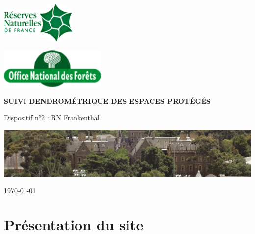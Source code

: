 \documentclass[a4paper]{book}\usepackage[]{graphicx}\usepackage[]{color}
\begin{document}
\thispagestyle{empty} %

\begin{multicols}{2}
\includegraphics[height=2cm]{Images/logo.png}
\begin{flushright}
\includegraphics[height=2cm]{Images/logoONF.png}
\end{flushright}

\end{multicols}

\vspace*{3cm}
\begin{center}
\textbf{SUIVI DENDROMÉTRIQUE DES ESPACES PROTÉGÉS}

\end{center}

\begin{center}
Dispositif n°2 : RN Frankenthal
\end{center}

\vspace*{2cm}
\begin{center}
\includegraphics[width=15cm]{Images/RB2.png}
\end{center}

\vspace*{1cm}
\begin{center}
\today
\end{center}

\tableofcontents
\thispagestyle{empty} %
\setcounter{page}{0}


\chapter{Présentation du site}
\end{document}
